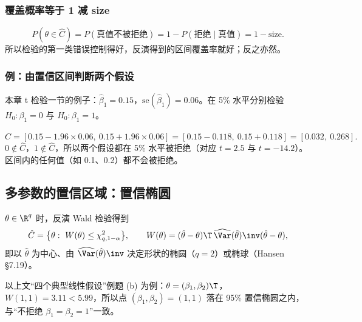 \subsubsection{覆盖概率等于 1 减 size}

\[
P(\theta\in\hat C)=P(\text{真值不被拒绝})=1-P(\text{拒绝}\mid\text{真值})=1-\text{size}.
\]
所以检验的第一类错误控制得好，反演得到的区间覆盖率就好；反之亦然。

\subsubsection{例：由置信区间判断两个假设}

\begin{exmp}[一个区间同时回答两个检验]\label{ex:U06b-CI}
本章 t 检验一节的例子：$\hat\beta_1=0.15$，$\mathrm{se}(\hat\beta_1)=0.06$。在 5\% 水平分别检验 $H_0:\beta_1=0$ 与 $H_0:\beta_1=1$。

\solution
\[
\hat C=[0.15-1.96\times0.06,\ 0.15+1.96\times0.06]=[0.15-0.118,\ 0.15+0.118]=[0.032,\ 0.268].
\]
$0\notin\hat C$，$1\notin\hat C$，所以两个假设都在 5\% 水平被拒绝（对应 $t=2.5$ 与 $t=-14.2$）。区间内的任何值（如 0.1、0.2）都不会被拒绝。
\end{exmp}

\subsection{多参数的置信区域：置信椭圆}

$\theta\in\R^q$ 时，反演 Wald 检验得到
\[
\hat C=\bigl\{\theta:\ W(\theta)\le\chi^2_{q,1-\alpha}\bigr\},\qquad W(\theta)=(\hat\theta-\theta)\T\,\widehat{\Var}(\hat\theta)\inv(\hat\theta-\theta),
\]
即以 $\hat\theta$ 为中心、由 $\widehat{\Var}(\hat\theta)\inv$ 决定形状的椭圆（$q=2$）或椭球（Hansen §7.19）。

以上文“四个典型线性假设”例题 (b) 为例：$\theta=(\beta_1,\beta_2)\T$，$W(1,1)=3.11<5.99$，所以点 $(\beta_1,\beta_2)=(1,1)$ 落在 95\% 置信椭圆之内，与“不拒绝 $\beta_1=\beta_2=1$”一致。

